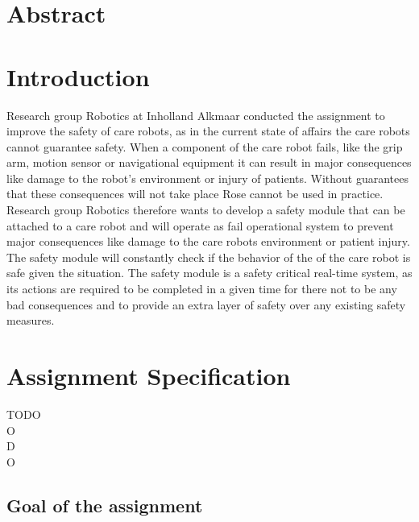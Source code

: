 \documentclass[12pt]{scrreprt}
\begin{document}
\chapter*{Abstract}
\tableofcontents
\newpage
{}

\chapter{Introduction}
\label{Introduction}
Research group Robotics at Inholland Alkmaar conducted the assignment to improve the safety of care robots, as in the current state of affairs the care robots cannot guarantee safety. When a component of the care robot fails, like the grip arm, motion sensor or navigational equipment it can result in major consequences like damage to the robot's environment or injury of patients. Without guarantees that these consequences will not take place Rose cannot be used in practice. Research group Robotics therefore wants to develop a safety module that can be attached to a care robot and will operate as fail operational system to prevent major consequences like damage to the care robots environment or patient injury. The safety module will constantly check if the behavior of the of the care robot is safe given the situation. The safety module is a safety critical real-time system, as its actions are required to be completed in a given time for there not to be any bad consequences and to provide an extra layer of safety over any existing safety measures.

\chapter{Assignment Specification}
TODO\\
O\\
D\\
O\\

\section{Goal of the assignment}
\label{Goal of the assignment}
\end{document}
